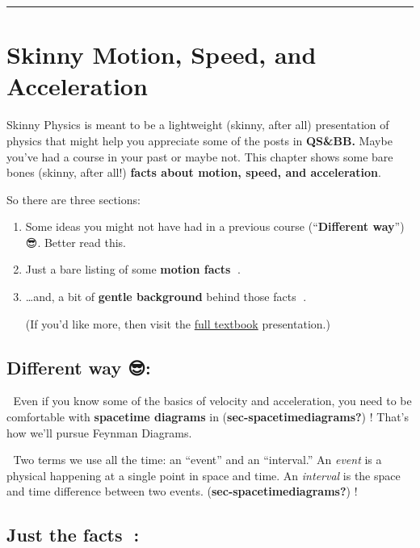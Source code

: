 \documentclass[
]{book}
\author{Chip Brock}
\date{2026-02-08}
\begin{document}
\frontmatter
\tableofcontents

\mainmatter
\begin{center}\rule{0.5\linewidth}{0.5pt}\end{center}

\chapter{Skinny Motion, Speed, and Acceleration}\label{skinny-motion-speed-and-acceleration}

Skinny Physics is meant to be a lightweight (skinny, after all) presentation of physics that might help you appreciate some of the posts in \textbf{QS\&BB.} Maybe you've had a course in your past or maybe not. This chapter shows some bare bones (skinny, after all!) \textbf{facts about motion, speed, and acceleration}.

So there are three sections:

\begin{enumerate}
\def\labelenumi{\arabic{enumi}.}
\item
  Some ideas you might not have had in a previous course (``\textbf{Different way}'') 😎. Better read this.
\item
  Just a bare listing of some \textbf{motion facts} 🎯.
\item
  \ldots and, a bit of \textbf{gentle background} behind those facts 🐇.

  (If you'd like more, then visit the \href{https://qstbb.pa.msu.edu/storage/ISP220_fall2020/QS&BB2020/intro.html}{full textbook} presentation.)
\end{enumerate}

\section{Different way 😎:}\label{different-way}

🫵 Even if you know some of the basics of velocity and acceleration, you need to be comfortable with \textbf{spacetime diagrams} in (\textbf{sec-spacetimediagrams?}) ! That's how we'll pursue Feynman Diagrams.

🫵 Two terms we use all the time: an ``event'' and an ``interval.'' An \emph{event} is a physical happening at a single point in space and time. An \emph{interval} is the space and time difference between two events. (\textbf{sec-spacetimediagrams?}) !

\section{Just the facts 🎯:}\label{just-the-facts}
\end{document}

